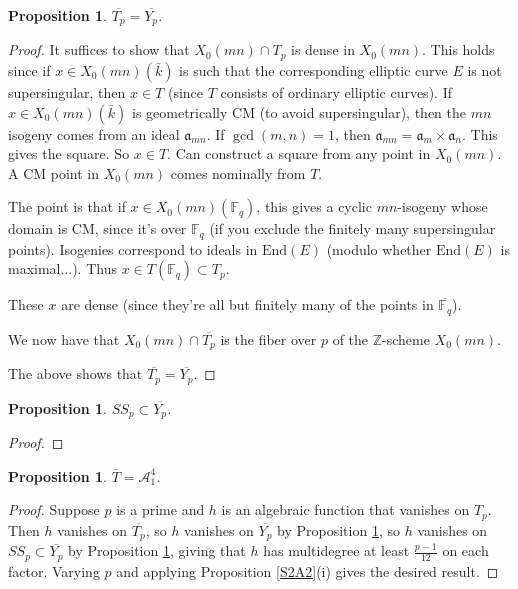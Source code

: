 \documentclass{amsart}
\def\Z{\mathbb{Z}}
\def\F{\mathbb{F}}
\def\AA{{\mathcal A}}
\def\End{\mathrm{End}}
\def\a{{\mathfrak a}}
\def\F{{\mathbb F}}
\numberwithin{equation}{section}
\newtheorem{prop}[thm]{Proposition}
\theoremstyle{definition}
\begin{document}
\begin{prop}
\label{TYp}
$\overline{T_p} = \overline{Y_p}$.
\end{prop}

\begin{proof}
It suffices to show that $X_0(mn) \cap T_p$ is dense in $X_0(mn)$.
This holds since if $x \in X_0(mn)(\bar{k})$ is such that the corresponding elliptic curve $E$ is not supersingular, then $x\in T$ (since $T$ consists of ordinary elliptic curves). If $x \in X_0(mn)(\bar{k})$ is geometrically CM (to avoid supersingular), then the $mn$ isogeny comes from an ideal $\a_{mn}$. If $\gcd(m,n)=1$, then $\a_{mn}=\a_{m} \times \a_{n}$. This gives the square. So $x \in T$. 
Can construct a square from any point in $X_0(mn)$. A CM point in $X_0(mn)$ comes nominally from $T$. 

The point is that if $x \in X_0(mn)({\F_q})$, this gives a cyclic $mn$-isogeny whose domain is CM, since it's over $\F_q$ (if you exclude the finitely many supersingular points). Isogenies correspond to ideals in $\End(E)$ (modulo whether $\End(E)$ is maximal...). Thus $x \in T(\F_q) \subset T_p$.

These $x$ are dense (since they're all but finitely many of the points in $\overline{\F_q}$).

We now have that $X_0(mn) \cap \overline{T_p}$ is the fiber over $p$ of the $\Z$-scheme $X_0(mn)$.

The above shows that $\overline{T_p} = \overline{Y_p}$.
\end{proof}



\begin{prop}
\label{SSYp}
$SS_p \subset \overline{Y_p}$.
\end{prop}

\begin{proof}
\end{proof}

\begin{prop}
\label{TA1}
$\overline{T} = \AA_1^4$.
\end{prop}

\begin{proof}
Suppose $p$ is a prime and $h$ is an algebraic function that vanishes on $T_p$.
Then $h$ vanishes on $\overline{T_p}$, so $h$ vanishes on $\overline{Y_p}$ by Proposition \ref{TYp}, so $h$ vanishes on $SS_p \subset \overline{Y_p}$ by Proposition \ref{SSYp}, giving that $h$ has multidegree at least ${\frac{p-1}{12}}$ on each factor.
Varying $p$ and applying Proposition \ref{S2A2}(i) gives the desired result.
\end{proof}
\end{document}
